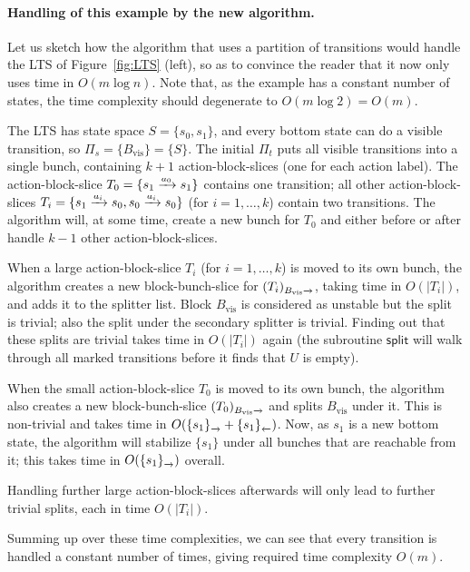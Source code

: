 \documentclass[a4paper,10pt]{article}
\theoremstyle{definition}
\theoremstyle{plain}
\newcommand{\bigo}[1]{{O\!\left(#1\right)}}
\newcommand{\pijl}[1]{\mathrel{\text{$\xrightarrow{\smash[t]{#1}}$}}}
\newcommand{\lijp}[1]{\mathrel{\text{$\xleftarrow{\smash[t]{#1}}$}}}
\newcommand{\size}[1]{\left\lvert #1 \right\rvert}
\begin{document}
\paragraph{Handling of this example by the new algorithm.}

Let us sketch how the algorithm that uses a partition of transitions would handle the LTS of Figure~\ref{fig:LTS} (left),
so as to convince the reader that it now only uses time in $\bigo{m \log n}$.
Note that, as the example has a constant number of states, the time complexity should degenerate to $\bigo{m \log 2} = \bigo{m}$.

The LTS has state space $S = \{ s_0, s_1 \}$, and every bottom state can do a visible transition, so $\Pi_s = \{ B_\mathrm{vis} \} = \{ S \}$.
The initial $\Pi_t$ puts all visible transitions into a single bunch, containing $k+1$ action-block-slices (one for each action label).
The action-block-slice $T_0 = \{ s_1 \pijl{a_0} s_1 \}$ contains one transition;
all other action-block-slices $T_i = \{ s_1 \pijl{a_i} s_0, s_0 \pijl{a_i} s_0 \}$ (for $i = 1, \ldots, k$) contain two transitions.
The algorithm will, at some time, create a new bunch for $T_0$
and either before or after handle $k-1$ other action-block-slices.

When a large action-block-slice $T_i$ (for $i = 1, \ldots, k$) is moved to its own bunch,
the algorithm creates a new block-bunch-slice for $(T_i)_{B_\mathrm{vis} \pijl{}}$, taking time in $\bigo{\size{T_i}}$,
and adds it to the splitter list.
Block $B_\mathrm{vis}$ is considered as unstable but the split is trivial;
also the split under the secondary splitter is trivial.
Finding out that these splits are trivial takes time in $\bigo{\size{T_i}}$ again
(the subroutine $\mathsf{split}$ will walk through all marked transitions before it finds that $U$ is empty).

When the small action-block-slice $T_0$ is moved to its own bunch,
the algorithm also creates a new block-bunch-slice $(T_0)_{B_\mathrm{vis} \pijl{}}$
and splits $B_\mathrm{vis}$ under it.
This is non-trivial and takes time in $\bigo{ \{s_1\}_{\pijl{}} + \{s_1\}_{\lijp{}} }$.
Now, as $s_1$ is a new bottom state, the algorithm will stabilize $\{ s_1 \}$ under all bunches that are reachable from it;
this takes time in $\bigo{\{ s_1 \}_{\pijl{}}}$ overall.

Handling further large action-block-slices afterwards will only lead to further trivial splits, each in time $\bigo{\size{T_i}}$.

Summing up over these time complexities,
we can see that every transition is handled a constant number of times, giving required time complexity $\bigo{m}$.
\end{document}
